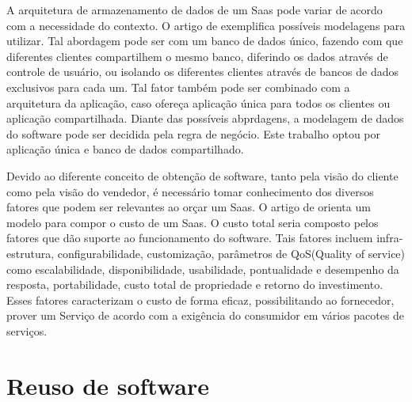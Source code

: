 A arquitetura de armazenamento de dados de um Saas pode variar de acordo com a necessidade do contexto. O artigo de \citep{7586486} exemplifica possíveis modelagens para utilizar. Tal abordagem pode ser com um banco de dados único, fazendo com que diferentes clientes compartilhem o mesmo banco, diferindo os dados através de controle de usuário, ou isolando os diferentes clientes através de bancos de dados exclusivos para cada um. Tal fator também pode ser combinado com a arquitetura da aplicação, caso ofereça aplicação única para todos os clientes ou aplicação compartilhada. Diante das possíveis abprdagens, a modelagem de dados do software pode ser decidida pela regra de negócio. Este trabalho optou por aplicação única e banco de dados compartilhado.


Devido ao diferente conceito de obtenção de software, tanto pela visão do cliente como pela visão do vendedor, é necessário tomar conhecimento dos diversos fatores que podem ser relevantes ao orçar um Saas. O artigo de \citep{6949281} orienta um modelo para compor o custo de um Saas. O custo total seria composto pelos fatores que dão suporte ao funcionamento do software. Tais fatores incluem infra-estrutura, configurabilidade, customização, parâmetros de QoS(Quality of service) como escalabilidade, disponibilidade, usabilidade, pontualidade e desempenho da resposta, portabilidade, custo total de propriedade e retorno do investimento. Esses fatores caracterizam o custo de forma eficaz, possibilitando ao fornecedor, prover um Serviço de acordo com a exigência do consumidor em vários pacotes de serviços.


\section{Reuso de software}\label{sec:reuso}

